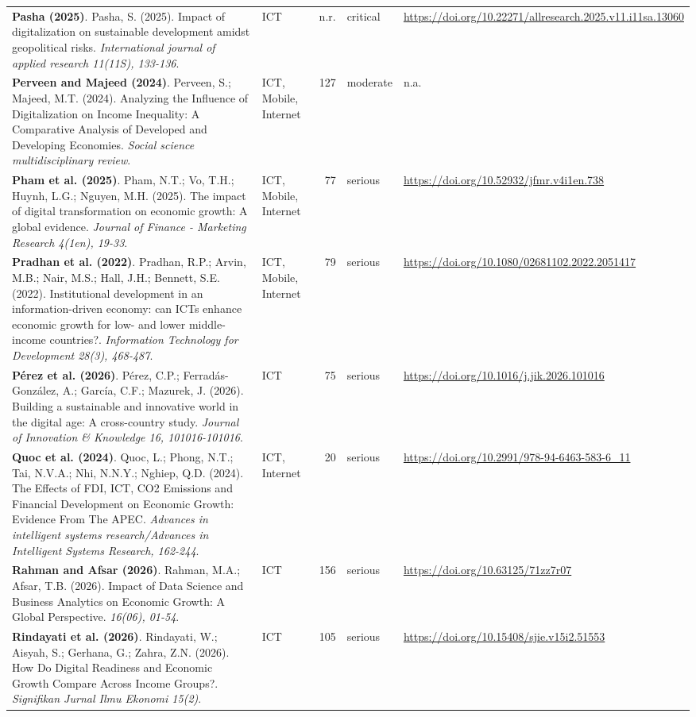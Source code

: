 {\begin{longtable}{@{}p{7.4cm} p{1.3cm} r l p{3.4cm}@{}}
\textbf{Pasha (2025)}. Pasha, S. (2025). Impact of digitalization on sustainable development amidst geopolitical risks. \emph{International journal of applied research 11(11S), 133-136}. & ICT & n.r. & critical & \url{https://doi.org/10.22271/allresearch.2025.v11.i11sa.13060} \\
\textbf{Perveen and Majeed (2024)}. Perveen, S.; Majeed, M.T. (2024). Analyzing the Influence of Digitalization on Income Inequality: A Comparative Analysis of Developed and Developing Economies. \emph{Social science multidisciplinary review}. & ICT, Mobile, Internet & 127 & moderate & n.a. \\
\textbf{Pham et al. (2025)}. Pham, N.T.; Vo, T.H.; Huynh, L.G.; Nguyen, M.H. (2025). The impact of digital transformation on economic growth: A global evidence. \emph{Journal of Finance - Marketing Research 4(1en), 19-33}. & ICT, Mobile, Internet & 77 & serious & \url{https://doi.org/10.52932/jfmr.v4i1en.738} \\
\textbf{Pradhan et al. (2022)}. Pradhan, R.P.; Arvin, M.B.; Nair, M.S.; Hall, J.H.; Bennett, S.E. (2022). Institutional development in an information-driven economy: can ICTs enhance economic growth for low- and lower middle-income countries?. \emph{Information Technology for Development 28(3), 468-487}. & ICT, Mobile, Internet & 79 & serious & \url{https://doi.org/10.1080/02681102.2022.2051417} \\
\textbf{Pérez et al. (2026)}. Pérez, C.P.; Ferradás-González, A.; García, C.F.; Mazurek, J. (2026). Building a sustainable and innovative world in the digital age: A cross-country study. \emph{Journal of Innovation \& Knowledge 16, 101016-101016}. & ICT & 75 & serious & \url{https://doi.org/10.1016/j.jik.2026.101016} \\
\textbf{Quoc et al. (2024)}. Quoc, L.; Phong, N.T.; Tai, N.V.A.; Nhi, N.N.Y.; Nghiep, Q.D. (2024). The Effects of FDI, ICT, CO2 Emissions and Financial Development on Economic Growth: Evidence From The APEC. \emph{Advances in intelligent systems research/Advances in Intelligent Systems Research, 162-244}. & ICT, Internet & 20 & serious & \url{https://doi.org/10.2991/978-94-6463-583-6_11} \\
\textbf{Rahman and Afsar (2026)}. Rahman, M.A.; Afsar, T.B. (2026). Impact of Data Science and Business Analytics on Economic Growth: A Global Perspective. \emph{ 16(06), 01-54}. & ICT & 156 & serious & \url{https://doi.org/10.63125/71zz7r07} \\
\textbf{Rindayati et al. (2026)}. Rindayati, W.; Aisyah, S.; Gerhana, G.; Zahra, Z.N. (2026). How Do Digital Readiness and Economic Growth Compare Across Income Groups?. \emph{Signifikan Jurnal Ilmu Ekonomi 15(2)}. & ICT & 105 & serious & \url{https://doi.org/10.15408/sjie.v15i2.51553} \\

\end{longtable}}
